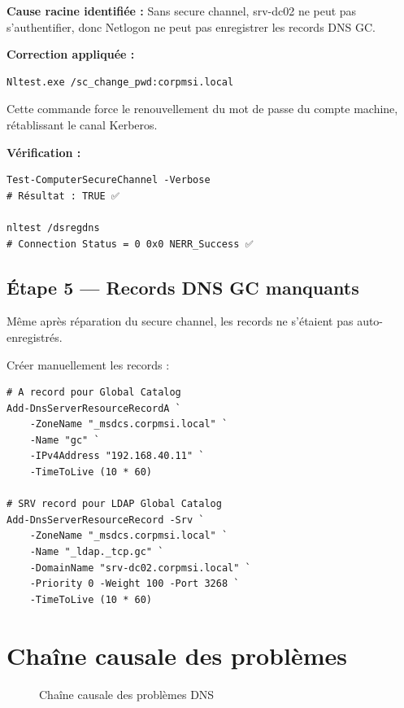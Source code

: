 \textbf{Cause racine identifiée :} Sans secure channel, srv-dc02 ne peut pas s'authentifier, donc Netlogon ne peut pas enregistrer les records DNS GC.

\textbf{Correction appliquée :}

\begin{lstlisting}[style=powershell]
Nltest.exe /sc_change_pwd:corpmsi.local
\end{lstlisting}

Cette commande force le renouvellement du mot de passe du compte machine, rétablissant le canal Kerberos.

\textbf{Vérification :}

\begin{lstlisting}[style=powershell]
Test-ComputerSecureChannel -Verbose
# Résultat : TRUE ✅

nltest /dsregdns
# Connection Status = 0 0x0 NERR_Success ✅
\end{lstlisting}

\subsection{Étape 5 — Records DNS GC manquants}

Même après réparation du secure channel, les records ne s'étaient pas auto-enregistrés.

Créer manuellement les records :

\begin{lstlisting}[style=powershell]
# A record pour Global Catalog
Add-DnsServerResourceRecordA `
    -ZoneName "_msdcs.corpmsi.local" `
    -Name "gc" `
    -IPv4Address "192.168.40.11" `
    -TimeToLive (10 * 60)

# SRV record pour LDAP Global Catalog
Add-DnsServerResourceRecord -Srv `
    -ZoneName "_msdcs.corpmsi.local" `
    -Name "_ldap._tcp.gc" `
    -DomainName "srv-dc02.corpmsi.local" `
    -Priority 0 -Weight 100 -Port 3268 `
    -TimeToLive (10 * 60)
\end{lstlisting}

\section{Chaîne causale des problèmes}

\begin{figure}[H]
    \centering
    \caption{Chaîne causale des problèmes DNS}
    \label{fig:dns-chain}
\end{figure}

